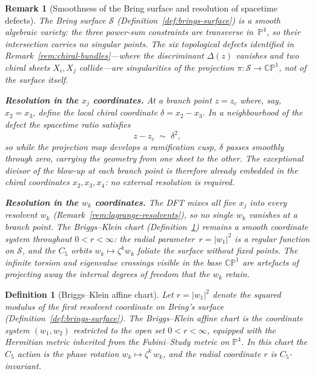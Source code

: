 \documentclass[12pt,a4paper]{report}
\newtheorem{definition}[theorem]{Definition}
\newtheorem{remark}[theorem]{Remark}
\begin{document}
\begin{remark}[Smoothness of the Bring surface and resolution of spacetime defects]
\label{rem:brings-smoothness}
The Bring surface $\mathcal{S}$ (Definition~\ref{def:brings-surface}) is a
\emph{smooth} algebraic variety: the three power-sum constraints are
transverse in~$\mathbb{P}^4$, so their intersection carries no singular
points.  The six topological defects identified in
Remark~\ref{rem:chiral-bundles}---where the discriminant $\Delta(z)$
vanishes and two chiral sheets $X_i,X_j$ collide---are singularities of
the \emph{projection} $\pi\colon\mathcal{S}\to\mathbb{CP}^1$, not of the
surface itself.

\medskip
\noindent\textbf{Resolution in the $x_j$ coordinates.}\;
At a branch point $z=z_c$ where, say, $x_2=x_3$, define the local chiral
coordinate $\delta=x_2-x_3$.  In a neighbourhood of the defect the
spacetime ratio satisfies
\[
  z-z_c\;\sim\;\delta^2,
\]
so while the projection map develops a ramification cusp, $\delta$ passes
smoothly through zero, carrying the geometry from one sheet to the other.
The exceptional divisor of the blow-up at each branch point is therefore
already embedded in the chiral coordinates $x_2,x_3,x_4$: no external
resolution is required.

\medskip
\noindent\textbf{Resolution in the $w_k$ coordinates.}\;
The DFT mixes all five $x_j$ into every resolvent $w_k$
(Remark~\ref{rem:lagrange-resolvents}), so no single $w_k$ vanishes at a
branch point.  The Briggs--Klein chart
(Definition~\ref{def:briggs-klein-chart}) remains a smooth coordinate
system throughout $0<r<\infty$: the radial parameter~$r=\lvert w_1\rvert^2$
is a regular function on $\mathcal{S}$, and the $C_5$ orbits
$w_k\mapsto\zeta^k w_k$ foliate the surface without fixed points.  The
infinite torsion and eigenvalue crossings visible in the base
$\mathbb{CP}^1$ are artefacts of projecting away the internal degrees of
freedom that the $w_k$ retain.
\end{remark}

\begin{definition}[Briggs--Klein affine chart]
\label{def:briggs-klein-chart}
Let $r=\lvert w_1\rvert^2$ denote the squared modulus of the first resolvent
coordinate on Bring's surface
(Definition~\ref{def:brings-surface}).  The
\emph{Briggs--Klein affine chart} is the coordinate system $(w_1,w_2)$
restricted to the open set $0<r<\infty$, equipped with the Hermitian metric
inherited from the Fubini--Study metric on $\mathbb{P}^4$.  In this chart
the $C_5$ action is the phase rotation $w_k\mapsto\zeta^k\,w_k$, and the
radial coordinate $r$ is $C_5$-invariant.
\end{definition}
\end{document}
